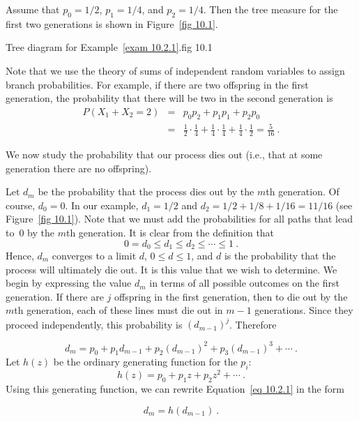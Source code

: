 \begin{example}\label{exam 10.2.1}
Assume that $p_0 = 1/2$, $p_1 = 1/4$, and $p_2 = 1/4$.  Then the tree measure
for the first two generations is shown in Figure~\ref{fig 10.1}.

{Tree diagram for Example~\protect\ref{exam 10.2.1}\protect.}{fig 10.1}

Note that we use the theory of sums of independent random variables to assign
branch probabilities.  For example, if there are two offspring in the first
generation, the probability that there will be two in the second generation is
\begin{eqnarray*}
P(X_1 + X_2 = 2) &=& p_0p_2 + p_1p_1 + p_2p_0 \\
                 &=& \frac12\cdot\frac14 + \frac14\cdot\frac14 +
\frac14\cdot\frac12 = \frac 5{16}\ .
\end{eqnarray*}
\par
We now study the probability that our process dies out (i.e., that at some
generation there are no offspring).
\par
Let $d_m$ be the probability that the process dies out by the $m$th
generation.  Of course, $d_0 = 0$.  In our example, $d_1 = 1/2$ and $d_2 = 1/2
+ 1/8 + 1/16 = 11/16$ (see Figure~\ref{fig 10.1}).  Note that we must add the 
probabilities for all paths that lead to~0 by the $m$th generation.  It is 
clear from the definition that
$$
0 = d_0 \leq d_1 \leq d_2 \leq\cdots\leq 1\ .
$$
Hence, $d_m$ converges to a limit $d$, $0 \leq d \leq 1$, and $d$ is the
probability that the process will ultimately die out.  It is this value that we
wish to determine.  We begin by expressing the value $d_m$ in terms of all
possible outcomes on the first generation.  If there are $j$ offspring in the
first generation, then to die out by the $m$th generation, each of these lines
must die out in $m - 1$ generations.  Since they proceed independently, this
probability is $(d_{m - 1})^j$.  Therefore
 
\begin{equation}
d_m = p_0 + p_1d_{m - 1} + p_2(d_{m - 1})^2 + p_3(d_{m - 1})^3 +\cdots\ .
\label{eq 10.2.1} 
\end{equation} 
Let $h(z)$ be the ordinary generating function for the $p_i$:
$$
h(z) = p_0 + p_1z + p_2z^2 +\cdots\ .
$$
Using this generating function, we can rewrite Equation~\ref{eq 10.2.1} in the form

\begin{equation}
d_m = h(d_{m - 1})\ . 
\label{eq 10.2.2}
\end{equation}
 

\end{example}

